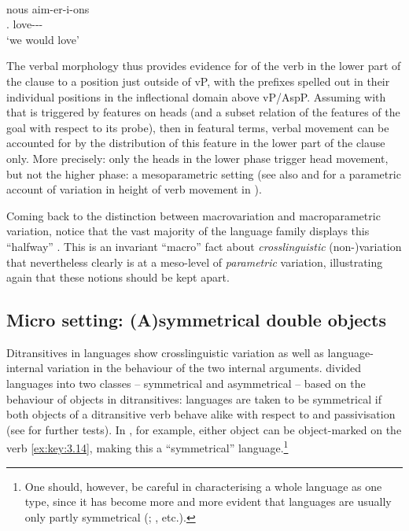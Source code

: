 \documentclass[output=paper]{langsci/langscibook}
\begin{document}
\ea\label{ex:key:3.13} \\
    \sn
    \gll  nous  aim-er-i-ons\\
          \Fsg{}.\Pron{}  love-\Irr{}-\Pst{}-\Fsg{}\\
    \glt  ‘we would love’
\z

The verbal morphology thus provides evidence for  of the
verb in the lower part of the clause to a position just outside of vP, with the
prefixes spelled out in their individual positions in the inflectional domain
above vP/AspP. Assuming with \citet{Roberts2010} that  is
triggered by features on heads (and a subset relation of the features of the
goal with respect to its probe), then in featural terms,  verbal
movement can be accounted for by the distribution of this
feature in the lower part of the clause only. More precisely: only the heads in
the lower phase trigger head movement, but not the higher phase: a
mesoparametric setting (see also \citealt{Ledgeway2013} and
\citealt{Schifano2015} for a parametric account of variation in height of verb
movement in ).

Coming back to the distinction between macrovariation and macroparametric
variation, notice that the vast majority of the language family displays this
“halfway” . This is an invariant “macro” fact about 
\emph{crosslinguistic} (non-)variation that nevertheless clearly is at a
meso-level of \emph{parametric} variation, illustrating again that these
notions should be kept apart.

\subsection{Micro setting: (A)symmetrical double objects}\label{sub:3.2.3}

Ditransitives in  languages show crosslinguistic variation as well as
lan\-guage-internal variation in the behaviour of the two internal arguments.
\citet{BresMosh1990} divided  languages into two classes -- symmetrical
and asymmetrical -- based on the behaviour of objects in ditransitives:
languages are taken to be symmetrical if both objects of a ditransitive
verb
behave alike with respect to  and passivisation (see
\citealt{Ngonyani1996,Buell2005} for further tests). In , for
example, either object can be object-marked on the verb \eqref{ex:key:3.14},
making this a \enquote{symmetrical} language.\footnote{One should, however, be careful
    in characterising a whole language as one type, since it has become more
    and more evident that languages are usually only partly symmetrical
    (\citealt{Schadeberg1995,Rugemalira1991,Thwala2006,Ngonyani1996,NgonyaniGithinji2006,Riedel2009,Baker1988,AlsinaMchombo1993,Simango1995,ZellerNgoboka2006,Jerro2015};
, etc.).}
\end{document}
